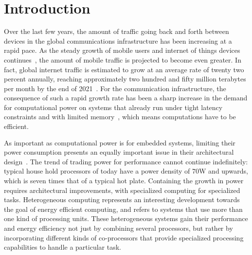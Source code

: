 

%
%

\chapter{Introduction}

Over the last few years, the amount of traffic going back and forth between devices in the global communications infrastructure has been increasing at a rapid pace. As the steady growth of mobile users and internet of things devices continues~\cite{ericsson2016}, the amount of mobile traffic is projected to become even greater. In fact, global internet traffic is estimated to grow at an average rate of twenty two percent annually, reaching approximately two hundred and fifty million terabytes per month by the end of 2021~\cite{cisco2016}. For the communication infrastructure, the consequence of such a rapid growth rate has been a sharp increase in the demand for computational power on systems that already run under tight latency constraints and with limited memory~\cite{persson2014}, which means computations have to be efficient.

As important as computational power is for embedded systems, limiting their power consumption presents an equally important issue in their architectural design~\cite{mudge2001}. The trend of trading power for performance cannot continue indefinitely: typical house hold processors of today have a power density of 70W and upwards, which is seven times that of a typical hot plate. Containing the growth in power requires architectural improvements, with specialized computing for specialized tasks. Heterogeneous computing represents an interesting development towards the goal of energy efficient computing, and refers to systems that use more than one kind of processing units. These heterogeneous systems gain their performance and energy efficiency not just by combining several processors, but rather by incorporating different kinds of co-processors that provide specialized processing capabilities to handle a particular task.

